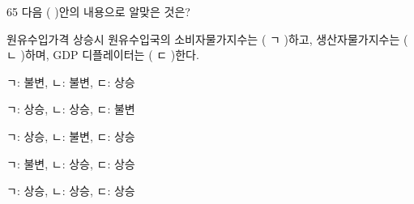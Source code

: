 \begin{question}{65}
다음 ( )안의 내용으로 알맞은 것은?

\begin{framedtext}
원유수입가격 상승시 원유수입국의 소비자물가지수는 ( ㄱ )하고, 생산자물가지수는 ( ㄴ )하며, GDP 디플레이터는 ( ㄷ )한다. \par
\end{framedtext}
\begin{choices}
  \item ㄱ: 불변, ㄴ: 불변, ㄷ: 상승
  \item ㄱ: 상승, ㄴ: 상승, ㄷ: 불변
  \item ㄱ: 상승, ㄴ: 불변, ㄷ: 상승
  \item ㄱ: 불변, ㄴ: 상승, ㄷ: 상승
  \item ㄱ: 상승, ㄴ: 상승, ㄷ: 상승
\end{choices}
\end{question}
